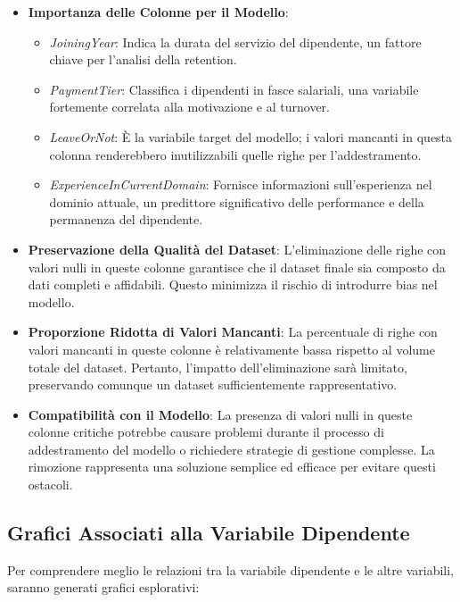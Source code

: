 \documentclass[a4paper,12pt]{article}
\begin{document}
\begin{itemize}
    \item \textbf{Importanza delle Colonne per il Modello}:
    \begin{itemize}
        \item \textit{JoiningYear}: Indica la durata del servizio del dipendente, un fattore chiave per l'analisi della retention.
        \item \textit{PaymentTier}: Classifica i dipendenti in fasce salariali, una variabile fortemente correlata alla motivazione e al turnover.
        \item \textit{LeaveOrNot}: È la variabile target del modello; i valori mancanti in questa colonna renderebbero inutilizzabili quelle righe per l'addestramento.
        \item \textit{ExperienceInCurrentDomain}: Fornisce informazioni sull'esperienza nel dominio attuale, un predittore significativo delle performance e della permanenza del dipendente.
    \end{itemize}

    \item \textbf{Preservazione della Qualità del Dataset}:
    L'eliminazione delle righe con valori nulli in queste colonne garantisce che il dataset finale sia composto da dati completi e affidabili. Questo minimizza il rischio di introdurre bias nel modello.

    \item \textbf{Proporzione Ridotta di Valori Mancanti}:
    La percentuale di righe con valori mancanti in queste colonne è relativamente bassa rispetto al volume totale del dataset. Pertanto, l'impatto dell'eliminazione sarà limitato, preservando comunque un dataset sufficientemente rappresentativo.

    \item \textbf{Compatibilità con il Modello}:
    La presenza di valori nulli in queste colonne critiche potrebbe causare problemi durante il processo di addestramento del modello o richiedere strategie di gestione complesse. La rimozione rappresenta una soluzione semplice ed efficace per evitare questi ostacoli.
\end{itemize}

\subsection{Grafici Associati alla Variabile Dipendente}
Per comprendere meglio le relazioni tra la variabile dipendente e le altre variabili, saranno generati grafici esplorativi:
\end{document}
